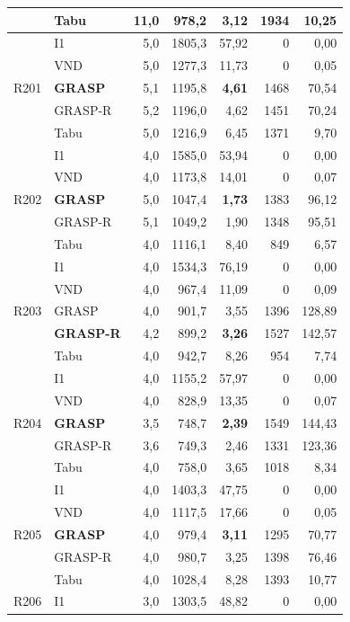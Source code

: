 {\begin{longtable}{llrrrrr}
  & \textbf{Tabu} & 11,0 & 978,2 & \textbf{3,12} & 1934 & 10,25 \\
\midrule
\multirow{5}{*}{R201}
  & I1 & 5,0 & 1805,3 & 57,92 & 0 & 0,00 \\
  & VND & 5,0 & 1277,3 & 11,73 & 0 & 0,05 \\
  & \textbf{GRASP} & 5,1 & 1195,8 & \textbf{4,61} & 1468 & 70,54 \\
  & GRASP-R & 5,2 & 1196,0 & 4,62 & 1451 & 70,24 \\
  & Tabu & 5,0 & 1216,9 & 6,45 & 1371 & 9,70 \\
\midrule
\multirow{5}{*}{R202}
  & I1 & 4,0 & 1585,0 & 53,94 & 0 & 0,00 \\
  & VND & 4,0 & 1173,8 & 14,01 & 0 & 0,07 \\
  & \textbf{GRASP} & 5,0 & 1047,4 & \textbf{1,73} & 1383 & 96,12 \\
  & GRASP-R & 5,1 & 1049,2 & 1,90 & 1348 & 95,51 \\
  & Tabu & 4,0 & 1116,1 & 8,40 & 849 & 6,57 \\
\midrule
\multirow{5}{*}{R203}
  & I1 & 4,0 & 1534,3 & 76,19 & 0 & 0,00 \\
  & VND & 4,0 & 967,4 & 11,09 & 0 & 0,09 \\
  & GRASP & 4,0 & 901,7 & 3,55 & 1396 & 128,89 \\
  & \textbf{GRASP-R} & 4,2 & 899,2 & \textbf{3,26} & 1527 & 142,57 \\
  & Tabu & 4,0 & 942,7 & 8,26 & 954 & 7,74 \\
\midrule
\multirow{5}{*}{R204}
  & I1 & 4,0 & 1155,2 & 57,97 & 0 & 0,00 \\
  & VND & 4,0 & 828,9 & 13,35 & 0 & 0,07 \\
  & \textbf{GRASP} & 3,5 & 748,7 & \textbf{2,39} & 1549 & 144,43 \\
  & GRASP-R & 3,6 & 749,3 & 2,46 & 1331 & 123,36 \\
  & Tabu & 4,0 & 758,0 & 3,65 & 1018 & 8,34 \\
\midrule
\multirow{5}{*}{R205}
  & I1 & 4,0 & 1403,3 & 47,75 & 0 & 0,00 \\
  & VND & 4,0 & 1117,5 & 17,66 & 0 & 0,05 \\
  & \textbf{GRASP} & 4,0 & 979,4 & \textbf{3,11} & 1295 & 70,77 \\
  & GRASP-R & 4,0 & 980,7 & 3,25 & 1398 & 76,46 \\
  & Tabu & 4,0 & 1028,4 & 8,28 & 1393 & 10,77 \\
\midrule
\multirow{5}{*}{R206}
  & I1 & 3,0 & 1303,5 & 48,82 & 0 & 0,00 \\

\end{longtable}}
